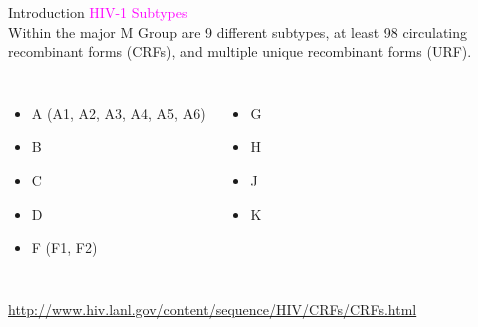 \documentclass{beamer}
\begin{document}
\begin{frame}{Introduction}
\textcolor{magenta}{HIV-1 Subtypes}\\
Within the major M Group are 9 different subtypes, at least 98 circulating recombinant forms (CRFs), and multiple unique recombinant forms (URF).
\begin{columns}[onlytextwidth]

\begin{itemize}
\item {A (A1, A2, A3, A4, A5, A6)}
\item {B}
\item {C}
\item {D}
\item {F (F1, F2)}
\end{itemize}
\hspace{50pt}

\begin{itemize}
\item {G}
\item {H}
\item {J}
\item {K}
\end{itemize}

\end{columns}
\vspace{5pt}
\centering
\footnotesize \href{http://www.hiv.lanl.gov/content/sequence/HIV/CRFs/CRFs.html}{http://www.hiv.lanl.gov/content/sequence/HIV/CRFs/CRFs.html}
\centering
\end{frame}
\end{document}
